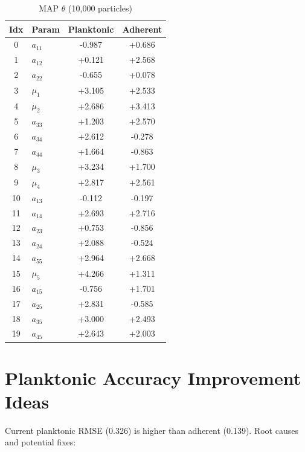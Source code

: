 \documentclass[11pt,a4paper]{article}
\begin{document}
\begin{table}[H]
\centering
\caption{MAP $\theta$ (10,000 particles)}
\label{tab:map}
\begin{tabular}{clcc}
\toprule
Idx & Param & Planktonic & Adherent \\
\midrule
    0 & $a_{11}$ & -0.987 & +0.686 \\
    1 & $a_{12}$ & +0.121 & +2.568 \\
    2 & $a_{22}$ & -0.655 & +0.078 \\
    3 & $\mu_1$ & +3.105 & +2.533 \\
    4 & $\mu_2$ & +2.686 & +3.413 \\
    5 & $a_{33}$ & +1.203 & +2.570 \\
    6 & $a_{34}$ & +2.612 & -0.278 \\
    7 & $a_{44}$ & +1.664 & -0.863 \\
    8 & $\mu_3$ & +3.234 & +1.700 \\
    9 & $\mu_4$ & +2.817 & +2.561 \\
    10 & $a_{13}$ & -0.112 & -0.197 \\
    11 & $a_{14}$ & +2.693 & +2.716 \\
    12 & $a_{23}$ & +0.753 & -0.856 \\
    13 & $a_{24}$ & +2.088 & -0.524 \\
    14 & $a_{55}$ & +2.964 & +2.668 \\
    15 & $\mu_5$ & +4.266 & +1.311 \\
    16 & $a_{15}$ & -0.756 & +1.701 \\
    17 & $a_{25}$ & +2.831 & -0.585 \\
    18 & $a_{35}$ & +3.000 & +2.493 \\
    19 & $a_{45}$ & +2.643 & +2.003 \\
\bottomrule
\end{tabular}
\end{table}

\section{Planktonic Accuracy Improvement Ideas}

Current planktonic RMSE (0.326) is higher than adherent
(0.139). Root causes and potential fixes:
\end{document}
